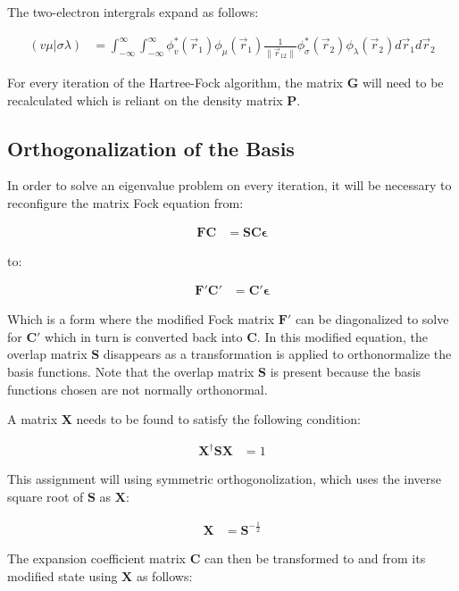 \documentclass[10pt, oneside, letterpaper]{article}
\begin{document}
The two-electron intergrals expand as follows:

\begin{align*}
  (v\mu|\sigma\lambda) &= \int_{-\infty}^{\infty}\int_{-\infty}^{\infty}  \phi_v^\ast(\vec{r}_1)\phi_\mu(\vec{r}_1) \frac{1}{\|\vec{r}_{12}\|}  \phi_\sigma^\ast(\vec{r}_2)\phi_\lambda(\vec{r}_2)  d\vec{r}_1d\vec{r}_2
\end{align*}

For every iteration of the Hartree-Fock algorithm, the matrix $\bm{G}$ will need to be recalculated which is reliant on the density matrix $\bm{P}$.

\subsection{Orthogonalization of the Basis}

In order to solve an eigenvalue problem on every iteration, it will be necessary to reconfigure the matrix Fock equation from:

\begin{align*}
\bm{F}\bm{C} &= \bm{S}\bm{C}\bm{\epsilon}
\end{align*}

to:

\begin{align*}
\bm{F}'\bm{C}' &= \bm{C}'\bm{\epsilon}
\end{align*}

Which is a form where the modified Fock matrix $\bm{F}'$ can be diagonalized to solve for $\bm{C}'$ which in turn is converted back into $\bm{C}$. In this modified equation, the overlap matrix $\bm{S}$ disappears as a transformation is applied to orthonormalize the basis functions. Note that the overlap matrix $\bm{S}$ is present because the basis functions chosen are not normally orthonormal.

A matrix $\bm{X}$ needs to be found to satisfy the following condition:

\begin{align*}
\bm{X}^\dagger\bm{S}\bm{X} &= 1
\end{align*}

This assignment will using symmetric orthogonolization, which uses the inverse square root of $\bm{S}$ as $\bm{X}$:

\begin{align*}
\bm{X} &= \bm{S}^{-\frac{1}{2}}
\end{align*}

The expansion coefficient matrix $\bm{C}$ can then be transformed to and from its modified state using $\bm{X}$ as follows:
\end{document}
